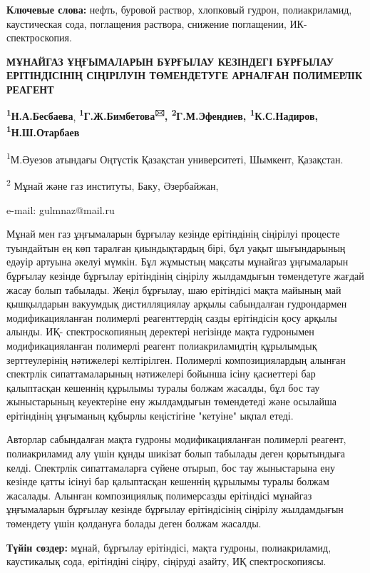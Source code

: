 {\bfseries Ключевые слова:} нефть, буровой раствор, хлопковый гудрон,
полиакриламид, каустическая сода, поглащения раствора, снижение
поглащении, ИК-спектроскопия.

\begin{center}
{\large\bfseries МҰНАЙГАЗ ҰҢҒЫМАЛАРЫН БҰРҒЫЛАУ КЕЗІНДЕГІ БҰРҒЫЛАУ ЕРІТІНДІСІНІҢ
СІҢІРІЛУІН ТӨМЕНДЕТУГЕ АРНАЛҒАН ПОЛИМЕРЛІК РЕАГЕНТ}

{\bfseries \textsuperscript{1}Н.А.Бесбаева},
{\bfseries \textsuperscript{1}Г.Ж.Бимбетова\textsuperscript{🖂},
\textsuperscript{2}Г.М.Эфендиев, \textsuperscript{1}К.С.Надиров,
\textsuperscript{1}Н.Ш.Отарбаев}

\textsuperscript{1}М.Әуезов атындағы Оңтүстік Қазақстан университеті,
Шымкент, Қазақстан.

\textsuperscript{2} Мұнай және газ институты, Баку, Әзербайжан,

e-mail: gulmnaz@mail.ru
\end{center}

Мұнай мен газ ұңғымаларын бұрғылау кезінде ерітіндінің сіңірілуі
процесте туындайтын ең көп таралған қиындықтардың бірі, бұл уақыт
шығындарының едәуір артуына әкелуі мүмкін. Бұл жұмыстың мақсаты мұнайгаз
ұңғымаларын бұрғылау кезінде бұрғылау ерітіндінің сіңірілу жылдамдығын
төмендетуге жағдай жасау болып табылады. Жеңіл бұрғылау, шаю ерітіндісі
мақта майының май қышқылдарын вакуумдық дистилляциялау арқылы
сабындалған гудрондармен модификацияланған полимерлі реагенттердің сазды
ерітіндісін қосу арқылы алынды. ИҚ- спектроскопияның деректері негізінде
мақта гудронымен модификацияланған полимерлі реагент полиакриламидтің
құрылымдық зерттеулерінің нәтижелері келтірілген. Полимерлі
композициялардың алынған спектрлік сипаттамаларының нәтижелері бойынша
ісіну қасиеттері бар қалыптасқан кешеннің құрылымы туралы болжам
жасалды, бұл бос тау жыныстарының кеуектеріне ену жылдамдығын
төмендетеді және осылайша ерітіндінің ұңғыманың құбырлы кеңістігіне
"кетуіне" ықпал етеді.

Авторлар сабындалған мақта гудроны модификацияланған полимерлі реагент,
полиакриламид алу үшін құнды шикізат болып табылады деген қорытындыға
келді. Спектрлік сипаттамаларға сүйене отырып, бос тау жыныстарына ену
кезінде қатты ісінуі бар қалыптасқан кешеннің құрылымы туралы болжам
жасалады. Алынған композициялық полимерсазды ерітіндісі мұнайгаз
ұңғымаларын бұрғылау кезінде бұрғылау ерітіндісінің сіңірілу жылдамдығын
төмендету үшін қолдануға болады деген болжам жасалды.

{\bfseries Түйін сөздер:} мұнай, бұрғылау ерітіндісі, мақта гудроны,
полиакриламид, каустикалық сода, ерітіндіні сіңіру, сіңіруді азайту, ИҚ
спектроскопиясы.

